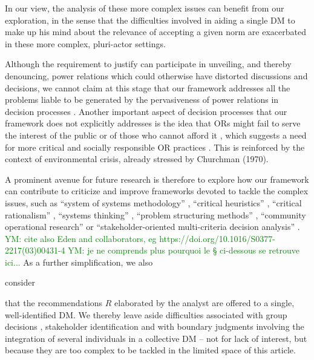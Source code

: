 \documentclass[preprint, french, english, 11pt, authoryear]{elsarticle}%
\newcommand{\commentYM}[1]{\textcolor{green}{YM: #1}}
\begin{document}
In our view, the analysis of these more complex issues can benefit from our exploration, in the sense that the difficulties involved in aiding a single \ac{DM} to make up his mind about the relevance of accepting a given norm are exacerbated in these more complex, pluri-actor settings.

\begin{changebar}Although the requirement to justify can participate in unveiling, and thereby denouncing, power relations which could otherwise have distorted discussions and decisions, 
we cannot claim at this stage that our framework addresses all the problems liable to be generated by the pervasiveness of power relations in decision processes \citep{cronin_issues_2014}.
Another important aspect of decision processes that our framework does not explicitly addresses is the idea that \acp{OR} might fail to serve the interest of the public or of those who cannot afford it \citep{rosenhead_report_1986}, 
which suggests a need for more critical and socially responsible OR practices \citep{jackson_systems_2000,ulrich_beyond_2003}. This is reinforced by the context of environmental crisis, already stressed by Churchman (1970).\end{changebar}
A prominent avenue for future research is therefore to explore how our framework can contribute to criticize and improve frameworks devoted to tackle the complex issues, such as ``system of systems methodology'' \citep{jackson_towards_1984}, ``critical heuristics'' \citep{ulrich_critical_1987}, 
``critical rationalism'' \citep{ormerod_critical_2014}, ``systems thinking'' \citep{mingers_review_2010}, ``problem structuring methods'' \citep{hector_problem-structuring_2009}, ``community operational research'' \citep{johnson_emerging_2018} or 
``stakeholder-oriented multi-criteria decision analysis'' \citep{de_brucker_multi-criteria_2013}.
\commentYM{cite also Eden and collaborators, eg https://doi.org/10.1016/S0377-2217(03)00431-4}
\commentYM{je ne comprends plus pourquoi le § ci-dessous se retrouve ici...}
As a further simplification, we also \begin{changebar}consider\end{changebar} that the recommendations $R$ elaborated by the analyst are offered to a single, well-identified \ac{DM}.
We thereby leave aside difficulties associated with group decisions \citep{jackson_towards_1984}, stakeholder identification \citep{wang_systemic_2015} and with boundary judgments involving the integration of several individuals in a collective \ac{DM} \citep{midgley_systemic_2000}
-- not for lack of interest, but because they are too complex to be tackled in the limited space of this article.
\end{document}
